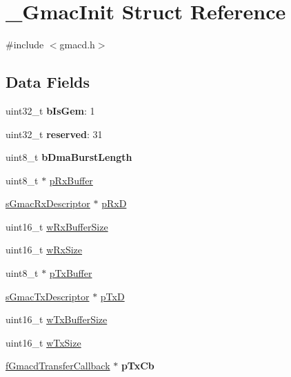 \hypertarget{struct__GmacInit}{}\section{\+\_\+\+Gmac\+Init Struct Reference}
\label{struct__GmacInit}


{\ttfamily \#include $<$gmacd.\+h$>$}

\subsection*{Data Fields}
\begin{DoxyCompactItemize}
\item 
\mbox{\label{struct__GmacInit_a071c21dc41d95ade4796c8a51d568e09}} 
uint32\+\_\+t {\bfseries b\+Is\+Gem}\+: 1
\item 
\mbox{\label{struct__GmacInit_aafd6e391422a1b254366e26682237590}} 
uint32\+\_\+t {\bfseries reserved}\+: 31
\item 
\mbox{\label{struct__GmacInit_a0ef74c847a13bb6ba4a9c571db3616f0}} 
uint8\+\_\+t {\bfseries b\+Dma\+Burst\+Length}
\item 
uint8\+\_\+t $\ast$ \mbox{\hyperlink{struct__GmacInit_ac60bbc0d4b39b341f6075974f26a40d3}{p\+Rx\+Buffer}}
\item 
\mbox{\hyperlink{group__gmac__structs_ga60c9fd1b0bff688c6e72c825d088a50b}{s\+Gmac\+Rx\+Descriptor}} $\ast$ \mbox{\hyperlink{struct__GmacInit_a2ad61f67d7627343c06d5c8ef61952a9}{p\+RxD}}
\item 
uint16\+\_\+t \mbox{\hyperlink{struct__GmacInit_a5117bae03b880af82ba8dd7bf4a334d3}{w\+Rx\+Buffer\+Size}}
\item 
uint16\+\_\+t \mbox{\hyperlink{struct__GmacInit_ae71c30d3bb9175cfa72b1fc8e49747b2}{w\+Rx\+Size}}
\item 
uint8\+\_\+t $\ast$ \mbox{\hyperlink{struct__GmacInit_afb6dc9cd22e214ca94fb8d4bc5a5977b}{p\+Tx\+Buffer}}
\item 
\mbox{\hyperlink{group__gmac__structs_ga69a2b24578edebf2e816c4d3ca20edeb}{s\+Gmac\+Tx\+Descriptor}} $\ast$ \mbox{\hyperlink{struct__GmacInit_ab0a287b2826177f18e0926dc29740db3}{p\+TxD}}
\item 
uint16\+\_\+t \mbox{\hyperlink{struct__GmacInit_a1572f258d874dd7dda4a6a6212608c4f}{w\+Tx\+Buffer\+Size}}
\item 
uint16\+\_\+t \mbox{\hyperlink{struct__GmacInit_a9f9b1f11aeae75fd0e37641e0309524b}{w\+Tx\+Size}}
\item 
\mbox{\label{struct__GmacInit_a36c6a406b4d2183646127b88946759cc}} 
\mbox{\hyperlink{group__gmacd__types_ga64979042bf43f697de166e864e3259de}{f\+Gmacd\+Transfer\+Callback}} $\ast$ {\bfseries p\+Tx\+Cb}
\end{DoxyCompactItemize}


